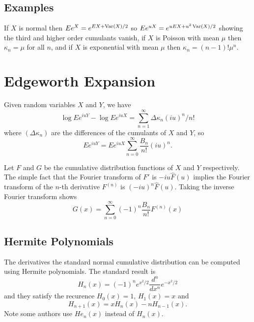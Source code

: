 \documentclass[11pt]{article}
\newcommand{\Var}{\mathop{\rm{Var}}}
\begin{document}
\subsection{Examples}
If \(X\) is
normal then \(Ee^X = e^{E X + \Var(X)/2}\) so
\(Ee^{uX} = e^{uEX + u^2\Var(X)/2}\) showing the
third and higher order cumulants vanish, if \(X\) is Poisson
with mean \(\mu\) then \(\kappa_n = \mu\) for all \(n\), and
if \(X\) is exponential with mean \(\mu\) then
\(\kappa_n = (n - 1)!\mu^n\).

\section{Edgeworth Expansion}
Given random
variables \(X\) and \(Y\), we have
\[\log E e^{iuY} - \log E e^{iuX} = \sum_{n=1}^\infty \Delta\kappa_n (iu)^n/n!\]
where \((\Delta\kappa_n)\) are the differences of the cumulants 
of \(X\) and \(Y\), so
\[
Ee^{iuY} = Ee^{iuX}\sum_{n=0}^\infty \frac{B_n}{n!}(iu)^n.
\]

Let \(F\) and \(G\) be the cumulative distribution functions of
\(X\) and \(Y\) respectively.
The simple fact that the Fourier transform of \(F'\) is \(-iu \hat F(u)\) 
implies the Fourier transform of the \(n\)-th derivative
\(F^{(n)}\) is \((-iu)^n\hat F(u)\).
Taking the inverse Fourier transform shows
\[
G(x) = \sum_{n=0}^\infty (-1)^n \frac{B_n}{n!} F^{(n)}(x)
\]

\subsection{Hermite Polynomials}
The derivatives the standard normal cumulative distribution 
can be computed using Hermite polynomials\cite{?}.
The standard result\cite{?} is
\[
H_n(x) = (-1)^n e^{x^2/2}\frac{d^n}{dx^n}e^{-x^2/2}
\]
and they satisfy the recurence \(H_0(x) = 1\), \(H_1(x) = x\) and
\[
H_{n+1}(x) = xH_n(x) - n H_{n-1}(x).
\]
Note some authors use \(He_n(x)\) instead of \(H_n(x)\).

%
\end{document}
